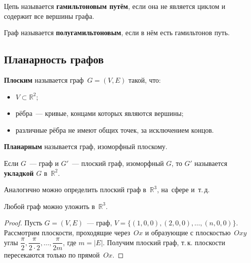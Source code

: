 Цепь называется \textbf{гамильтоновым путём}, если она не является циклом и содержит все вершины графа.

 Граф называется \textbf{полугамильтоновым}, если в нём есть гамильтонов путь.

\subsection{Планарность графов}
 \textbf{Плоским} называется граф~$G = (V, E)$ такой, что:
\begin{itemize}
	\item $V \subset \mathbb R^2$;
	\item рёбра~--- кривые, концами которых являются вершины;
	\item различные рёбра не имеют общих точек, за исключением концов.
\end{itemize}

\textbf{Планарным} называется граф, изоморфный плоскому.

Если $G$~--- граф и $G'$~--- плоский граф, изоморфный $G$, то $G'$ называется \textbf{укладкой $G$} в~$\mathbb R^2$.

Аналогично можно определить плоский граф в~$\mathbb R^3$, на~сфере и~т.\,д.

\begin{theorem}
Любой граф можно уложить в~$\mathbb R^3$.
\end{theorem}
\begin{proof}
Пусть $G = (V, E)$~--- граф, $V = \{ (1, 0, 0), (2, 0, 0), \ldots, (n, 0, 0) \}$.
Рассмотрим плоскости, проходящие через~$Ox$ и образующие с плоскостью~$Oxy$ углы
$\dfrac\pi2, \dfrac\pi{2\cdot2}, \ldots, \dfrac\pi{2m}$, где $m = |E|$.
Получим плоский граф, т.\,к. плоскости пересекаются только по прямой~$Ox$.
\end{proof}

